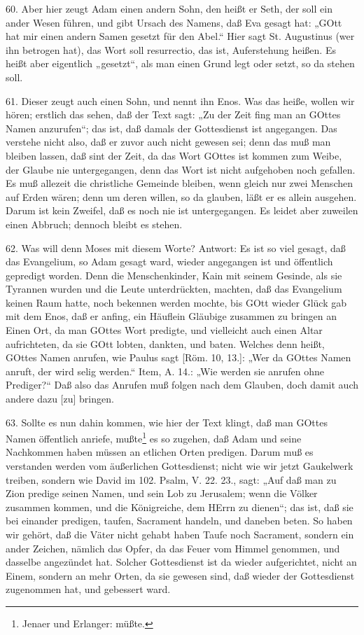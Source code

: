 60. Aber hier zeugt Adam einen andern Sohn, den heißt er Seth, der soll ein ander Wesen führen, und gibt Ursach des Namens, daß Eva gesagt hat: „GOtt hat mir einen andern Samen gesetzt für den Abel.“ Hier sagt St. Augustinus (wer ihn betrogen hat), das Wort soll resurrectio, das ist, Auferstehung heißen. Es heißt aber eigentlich „gesetzt“, als man einen Grund legt oder setzt, so da stehen soll.

61. Dieser zeugt auch einen Sohn, und nennt ihn Enos. Was das heiße, wollen wir hören; erstlich das sehen, daß der Text sagt: „Zu der Zeit fing man an GOttes Namen anzurufen“; das ist, daß damals der Gottesdienst ist angegangen. Das verstehe nicht also, daß er zuvor auch nicht gewesen sei; denn das muß man bleiben lassen, daß sint der Zeit, da das Wort GOttes ist kommen zum Weibe, der Glaube nie untergegangen, denn das Wort ist nicht aufgehoben noch gefallen. Es muß allezeit die christliche Gemeinde bleiben, wenn gleich nur zwei Menschen auf Erden wären; denn um deren willen, so da glauben, läßt er es allein ausgehen. Darum ist kein Zweifel, daß es noch nie ist untergegangen. Es leidet aber zuweilen einen Abbruch; dennoch bleibt es stehen.

62. Was will denn Moses mit diesem Worte? Antwort: Es ist so viel gesagt, daß das Evangelium, so Adam gesagt ward, wieder angegangen ist und öffentlich gepredigt worden. Denn die Menschenkinder, Kain mit seinem Gesinde, als sie Tyrannen wurden und die Leute unterdrückten, machten, daß das Evangelium keinen Raum hatte, noch bekennen werden mochte, bis GOtt wieder Glück gab mit dem Enos, daß er anfing, ein Häuflein Gläubige zusammen zu bringen an Einen Ort, da man GOttes Wort predigte, und vielleicht auch einen Altar aufrichteten, da sie GOtt lobten, dankten, und baten. Welches denn heißt, GOttes Namen anrufen, wie Paulus sagt [Röm. 10, 13.]: „Wer da GOttes Namen anruft, der wird selig werden.“ Item, A. 14.: „Wie werden sie anrufen ohne Prediger?“ Daß also das Anrufen muß folgen nach dem Glauben, doch damit auch andere dazu [zu] bringen.

63. Sollte es nun dahin kommen, wie hier der Text klingt, daß man GOttes Namen öffentlich anriefe, mußte\footnote{Jenaer und Erlanger: müßte.} es so zugehen, daß Adam und seine Nachkommen haben müssen an etlichen Orten predigen. Darum muß es verstanden werden vom äußerlichen Gottesdienst; nicht wie wir jetzt Gaukelwerk treiben, sondern wie David im 102. Psalm, V. 22. 23., sagt: „Auf daß man zu Zion predige seinen Namen, und sein Lob zu Jerusalem; wenn die Völker zusammen kommen, und die Königreiche, dem HErrn zu dienen“; das ist, daß sie bei einander predigen, taufen, Sacrament handeln, und daneben beten. So haben wir gehört, daß die Väter nicht gehabt haben Taufe noch Sacrament, sondern ein ander Zeichen, nämlich das Opfer, da das Feuer vom Himmel genommen, und dasselbe angezündet hat. Solcher Gottesdienst ist da wieder aufgerichtet, nicht an Einem, sondern an mehr Orten, da sie gewesen sind, daß wieder der Gottesdienst zugenommen hat, und gebessert ward.

